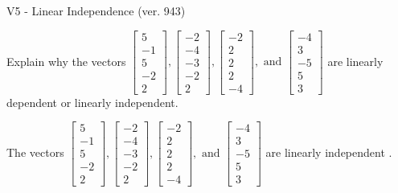 \begin{exercise}
  \begin{exerciseTitle}V5 - Linear Independence (ver. 943)\end{exerciseTitle}
  \begin{exerciseStatement}
    Explain why the vectors \(\left[\begin{array}{r}
5 \\
-1 \\
5 \\
-2 \\
2
\end{array}\right] , \left[\begin{array}{r}
-2 \\
-4 \\
-3 \\
-2 \\
2
\end{array}\right] , \left[\begin{array}{r}
-2 \\
2 \\
2 \\
2 \\
-4
\end{array}\right] , \text{ and } \left[\begin{array}{r}
-4 \\
3 \\
-5 \\
5 \\
3
\end{array}\right]\) are linearly dependent or linearly independent.	


  \end{exerciseStatement}
  \begin{exerciseAnswer}
   The vectors \(\left[\begin{array}{r}
5 \\
-1 \\
5 \\
-2 \\
2
\end{array}\right] , \left[\begin{array}{r}
-2 \\
-4 \\
-3 \\
-2 \\
2
\end{array}\right] , \left[\begin{array}{r}
-2 \\
2 \\
2 \\
2 \\
-4
\end{array}\right] , \text{ and } \left[\begin{array}{r}
-4 \\
3 \\
-5 \\
5 \\
3
\end{array}\right]\) are 
  	 linearly independent  .
  


  \end{exerciseAnswer}
\end{exercise}